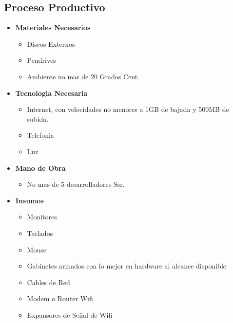 \documentclass[
10pt, %
a4paper, %
oneside, %
headinclude,footinclude, %
BCOR5mm, %
]{scrartcl}
\begin{document}
\subsection{Proceso Productivo}
\begin{itemize}
  \item \textbf {Materiales Necesarios}
  \begin{itemize}
    \item Discos Externos
    \item Pendrives
    \item Ambiente no mas de 20 Grados Cent.
  \end{itemize}

  \item \textbf {Tecnologia Necesaria}
  \begin{itemize}
    \item Internet, con velocidades no menores a
            1GB de bajada y 500MB de subida.
    \item Telefonia
    \item Luz
  \end{itemize}

  \item \textbf {Mano de Obra}
  \begin{itemize}
    \item No mas de 5 desarrolladores Ssr.
  \end{itemize}

  \item \textbf {Insumos}
  \begin{itemize}
    \item Monitores
    \item Teclados
    \item Mouse
    \item Gabinetes armados con lo mejor en hardware al alcance disponible
    \item Cables de Red
    \item Modem o Router Wifi
    \item Expansores de Señal de Wifi
  \end{itemize}
\end{itemize}
\end{document}
